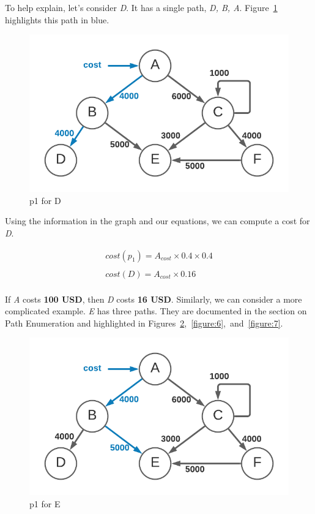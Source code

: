 \documentclass[10pt, a4paper, twocolumn]{article}
\begin{document}
      To help explain, let's consider \textit{D}.
      It has a single path, \textit{D, B, A}.
      Figure~\ref{figure:4} highlights this path in blue.

      \begin{figure}[H]
        \centering
        \includegraphics[width=\linewidth]{./truth-and-reconciliation-cost-d.png}
        \caption{p1 for D}
        \label{figure:4}
      \end{figure}

      Using the information in the graph and our equations, we can compute a cost for \textit{D}.

      \begin{gather*}
        cost(p_{1}) = A_{cost} \times 0.4 \times 0.4 \\
        \\
        cost(D) = A_{cost} \times 0.16 \\
      \end{gather*}

      If \textit{A} costs \textbf{100 USD}, then \textit{D} costs \textbf{16 USD}.
      Similarly, we can consider a more complicated example.
      \textit{E} has three paths.
      They are documented in the section on Path Enumeration and
      highlighted in Figures~\ref{figure:5},~\ref{figure:6},~and~\ref{figure:7}.

      \begin{figure}[H]
        \centering
        \includegraphics[width=\linewidth]{./truth-and-reconciliation-cost-ep1.png}
        \caption{p1 for E}
        \label{figure:5}
      \end{figure}
\end{document}
